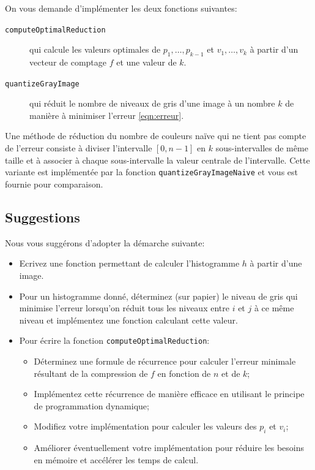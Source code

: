 \documentclass[a4paper,10pt]{article}
\begin{document}
On vous demande d'implémenter les deux fonctions suivantes:
\begin{description}
\item[\texttt{computeOptimalReduction}] qui calcule les valeurs optimales de $p_1,\ldots,p_{k-1}$ et $v_1,\ldots,v_k$ à partir d'un vecteur de comptage $f$ et une valeur de $k$.
\item[\texttt{quantizeGrayImage}] qui réduit le nombre de niveaux de gris d'une image à un nombre $k$ de manière à minimiser l'erreur \ref{eqn:erreur}.
\end{description}

Une méthode de réduction du nombre de couleurs naïve qui ne tient pas
compte de l'erreur consiste à diviser l'intervalle $[0,n-1]$ en $k$
sous-intervalles de même taille et à associer à chaque sous-intervalle
la valeur centrale de l'intervalle. Cette variante est implémentée par
la fonction \texttt{quantizeGrayImageNaive} et vous est fournie pour
comparaison.


\subsection*{Suggestions}

Nous vous suggérons d'adopter la démarche suivante:
\begin{itemize}
\item Ecrivez une fonction permettant de calculer l'histogramme $h$ à
  partir d'une image.
\item Pour un histogramme donné, déterminez (sur papier) le niveau de gris qui minimise l'erreur lorsqu'on réduit tous les niveaux entre $i$ et $j$ à ce même niveau et implémentez une fonction calculant cette valeur.
\item Pour écrire la fonction \texttt{computeOptimalReduction}:
\begin{itemize}
\item Déterminez une formule de récurrence pour calculer l'erreur minimale résultant de la compression de $f$ en fonction de $n$ et de $k$;
\item Implémentez cette récurrence de manière efficace en utilisant le principe de programmation dynamique;
\item Modifiez votre implémentation pour calculer les valeurs des $p_i$ et $v_i$;
\item Améliorer éventuellement votre implémentation pour réduire les
  besoins en mémoire et accélérer les temps de calcul.
\end{itemize}
\end{itemize}
\end{document}
